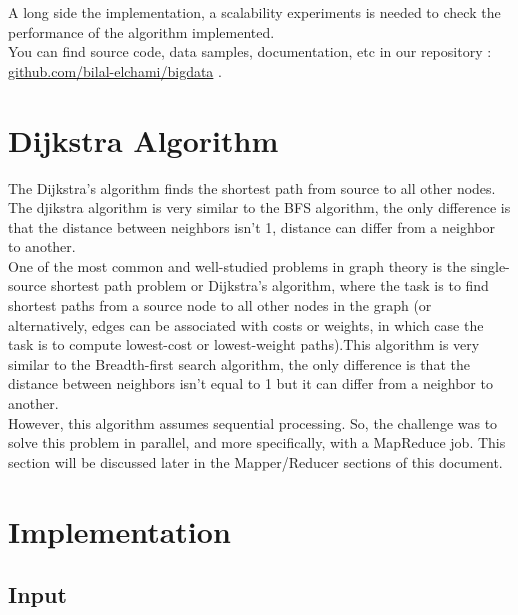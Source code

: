 \documentclass[english]{article}
\begin{document}
A long side the implementation, a scalability experiments is needed to check the performance of the algorithm implemented.\\

You can find source code, data samples, documentation, etc in our repository : \href{ https://github.com/bilal-elchami/bigdata}{github.com/bilal-elchami/bigdata} .

\section{Dijkstra Algorithm}
The Dijkstra’s algorithm finds the shortest path from source to all other nodes. The djikstra algorithm is very similar to the BFS algorithm, the only difference is that the distance between neighbors isn't 1, distance can differ from a neighbor to another.\\

One of the most common and well-studied problems in graph theory is the single-source shortest path problem or Dijkstra’s algorithm, where the task is to find shortest paths from a source node to all other nodes in the graph (or alternatively, edges can be associated with costs or weights, in which case the task is to compute lowest-cost or lowest-weight paths).This algorithm is very similar to the Breadth-first search algorithm, the only difference is that the distance between neighbors isn't equal to 1 but it can differ from a neighbor to another.\\

However, this algorithm assumes sequential processing. So, the challenge was to solve this problem in parallel, and more specifically, with a MapReduce job. This section will be discussed later in the Mapper/Reducer sections of this document.

\newpage
\section{Implementation}
\subsection{Input}
\end{document}
